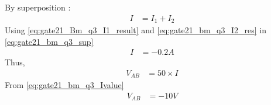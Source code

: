 \documentclass[journal,12pt,twocolumn]{IEEEtran}
\theoremstyle{remark}
\begin{document}
By superposition :   
\begin{align}
    I &= I_1 + I_2 \label{eq:gate21_bm_q3_sup}
\end{align}
Using \eqref{eq:gate21_Bm_q3_I1_result} and \eqref{eq:gate21_bm_q3_I2_res} in \eqref{eq:gate21_bm_q3_sup}
\begin{align}
    I &= -0.2A    \label{eq:gate21_bm_q3_Ivalue}
\end{align}
Thus,
\begin{align}  
    V_{AB} &= 50\times I
\end{align}
From \eqref{eq:gate21_bm_q3_Ivalue}
\begin{align}
    V_{AB} &= -10 V \label{eq:gate_21_bm_finalans} 
\end{align}
\end{document}
